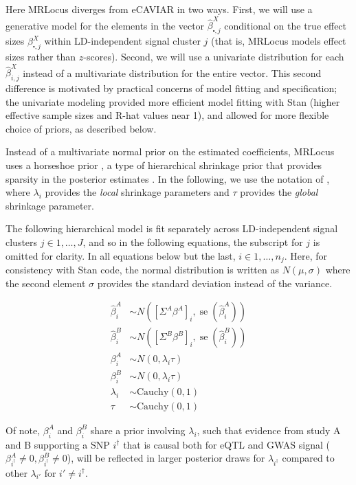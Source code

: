 \documentclass[11pt]{article}
\DeclareMathOperator{\se}{\textrm{se}}
\begin{document}
Here MRLocus diverges from eCAVIAR in two ways. First, we will use a
generative model for the elements in the vector
$\widehat{\beta}^X_{\centerdot,j}$ conditional on the true effect sizes
$\beta^X_{\centerdot,j}$ within LD-independent signal cluster
$j$ (that is, MRLocus models effect sizes rather than $z$-scores).
Second, we will use a univariate distribution for each
$\widehat{\beta}^X_{i,j}$ instead of a multivariate distribution for
the entire vector. This second difference is motivated by practical
concerns of model fitting and specification; the univariate modeling
provided more efficient model fitting with Stan (higher effective
sample sizes and R-hat values near 1), and allowed for more
flexible choice of priors, as described below. 

Instead of a multivariate normal prior on the estimated coefficients,
MRLocus uses a horseshoe prior \citep{horseshoe1,horseshoe2}, 
a type of hierarchical shrinkage prior that provides sparsity in the
posterior estimates \citep{hiershrink}. In the following, we use the
notation of \citet{horseshoe1}, where $\lambda_i$ provides the
\emph{local} shrinkage parameters and $\tau$ provides the
\emph{global} shrinkage parameter.

The following hierarchical model is fit separately across
LD-independent signal clusters $j \in 1,\dots,J$, and so in the
following equations, the subscript for $j$ is omitted for clarity. In
all equations below but the last, $i \in 1,\dots,n_j$. Here, for
consistency with Stan code, the normal distribution is written as
$N(\mu,\sigma)$ where the second element $\sigma$ provides the
standard deviation instead of the variance.

\begin{align}
  \widehat{\beta}^A_i &\sim N([\Sigma^A \beta^A]_i, \se(\widehat{\beta}^A_i)) \\
  \widehat{\beta}^B_i &\sim N([\Sigma^B \beta^B]_i, \se(\widehat{\beta}^B_i)) \\
  \beta_i^A &\sim N(0, \lambda_i \tau) \\
  \beta_i^B &\sim N(0, \lambda_i \tau) \\
  \lambda_i &\sim \textrm{Cauchy}(0,1) \\
  \tau &\sim \textrm{Cauchy}(0,1)
\end{align}

Of note, $\beta_i^A$ and $\beta_i^B$ share a prior involving
$\lambda_i$, such that evidence from study A and B supporting a
SNP $i^\dagger$ that is causal both for eQTL and GWAS signal
($\beta_{i^\dagger}^A \ne 0, \beta_{i^\dagger}^B \ne 0$),
will be reflected in larger posterior draws for $\lambda_{i^\dagger}$
compared to other $\lambda_{i'}$ for $i' \ne i^\dagger$.
\end{document}
